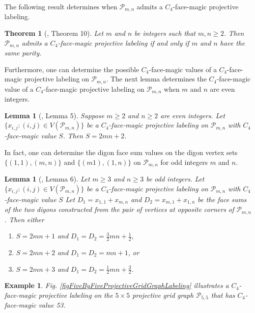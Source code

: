 \documentclass[12pt]{amsart}
\theoremstyle{definition}
\theoremstyle{plain}
\newtheorem{lemma}[definition]{Lemma}
\newtheorem{theorem}[definition]{Theorem}
\newtheorem{example}[definition]{Example}
\begin{document}
The following result determines when $\mathcal{P}_{m,n}$ admits a $C_4$-face-magic projective labeling.

\begin{theorem}[\cite{Curran2}, Theorem 10] \label{thmProjectiveGridIsC4FaceMaigc}
Let $m$ and $n$ be integers such that $m,n\geqslant 2$. Then $\mathcal{P}_{m,n}$ admits
a $C_4$-face-magic projective labeling if and only if $m$ and $n$ have the same parity.
\end{theorem}

Furthermore, one can determine the possible $C_4$-face-magic values of a $C_4$-face-magic projective labeling on $\mathcal{P}_{m,n}$.
The next lemma determines the $C_4$-face-magic value of a $C_4$-face-magic projective labeling on $\mathcal{P}_{m,n}$ when $m$ and $n$ are even integers.

\begin{lemma}[\cite{Curran2}, Lemma 5] \label{lemmaEvenByEvenProjectiveGridC4FaceValue}
Suppose $m \geqslant 2$ and $n \geqslant 2$ are even integers.
Let $\{ x_{i,j} : (i,j)\in V(\mathcal{P}_{m,n}) \}$ be a $C_4$-face-magic projective labeling on $\mathcal{P}_{m,n}$ with $C_4$-face-magic value $S$.
Then $S= 2mn+2$.
\end{lemma}

In fact, one can determine the digon face sum values on the digon vertex sets $\{ (1,1), (m,n)\}$ and $\{(m1), (1,n)\}$
on $\mathcal{P}_{m,n}$ for odd integers $m$ and $n$.

\begin{lemma}[\cite{Curran2}, Lemma 6] \label{lemmaOddByOddProjectiveGridC4FaceValue}
Let $m\geqslant 3$ and $n\geqslant 3$ be odd integers.
Let $\{ x_{i,j} : (i,j)\in V(\mathcal{P}_{m,n}) \}$ be a $C_4$-face-magic projective labeling on $\mathcal{P}_{m,n}$ with $C_4$-face-magic value $S$
Let $D_1=x_{1,1} + x_{m,n}$ and $D_2=x_{m,1} + x_{1,n}$ be the face sums of the two digons constructed from the pair of vertices at opposite corners of $\mathcal{P}_{m,n}$.
Then either
\begin{enumerate}
  \item $S=2mn+1$ and $D_1=D_2= \frac{3}{2} mn+ \frac{1}{2}$,
  \item $S=2mn+2$ and $D_1=D_2=mn+1$, or
  \item $S=2mn+3$ and $D_1=D_2= \frac{1}{2} mn+ \frac{3}{2}$.
\end{enumerate}
\end{lemma}

\begin{example}
Fig. \ref{figFiveByFiveProjectiveGridGraphLabeling} illustrates a $C_4$-face-magic projective labeling on the $5 \times 5$ projective grid graph $\mathcal{P}_{5,5}$
that has $C_4$-face-magic value 53.
\end{example}
\end{document}
